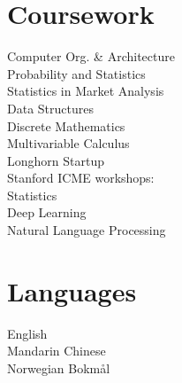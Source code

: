 \documentclass[]{houston-ethan-resume}
\begin{document}
\begin{minipage}[t]{0.33\textwidth}
\section{Coursework}
Computer Org. \& Architecture \\
Probability and Statistics \\
Statistics in Market Analysis \\
Data Structures \\
Discrete Mathematics \\
Multivariable Calculus \\
Longhorn Startup \\
Stanford ICME workshops: \\
\parindent15pt Statistics \\
\parindent15pt Deep Learning \\
\parindent15pt Natural Language Processing \\


\section{Languages}
\parindent0pt English \\ %
Mandarin Chinese \\
Norwegian Bokmål

%
%

\end{minipage}
\hfill
\end{document}
